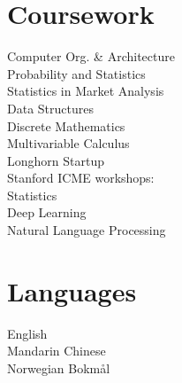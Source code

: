 \documentclass[]{houston-ethan-resume}
\begin{document}
\begin{minipage}[t]{0.33\textwidth}
\section{Coursework}
Computer Org. \& Architecture \\
Probability and Statistics \\
Statistics in Market Analysis \\
Data Structures \\
Discrete Mathematics \\
Multivariable Calculus \\
Longhorn Startup \\
Stanford ICME workshops: \\
\parindent15pt Statistics \\
\parindent15pt Deep Learning \\
\parindent15pt Natural Language Processing \\


\section{Languages}
\parindent0pt English \\ %
Mandarin Chinese \\
Norwegian Bokmål

%
%

\end{minipage}
\hfill
\end{document}
